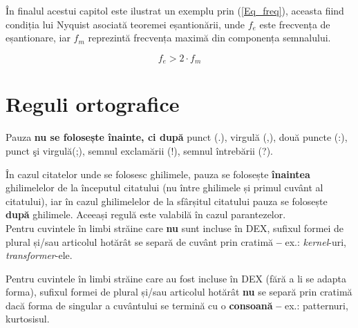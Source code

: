 În finalul acestui capitol este ilustrat un exemplu prin (\ref{Eq_freq}), aceasta fiind condiția lui Nyquist asociată teoremei eșantionării, unde $f_e$ este frecvența de eșantionare, iar $f_m$ reprezintă frecvența maximă din componența semnalului.

\begin{equation}
    f_e > 2 \cdot f_m
    \label{Eq_freq}
\end{equation}

\section{Reguli ortografice}

Pauza \textbf{nu se folosește înainte, ci după} punct (.), virgulă (,), două puncte (:), punct şi virgulă(;), semnul exclamării (!), semnul întrebării (?).
 
În cazul citatelor unde se folosesc ghilimele, pauza se folosește \textbf{înaintea} ghilimelelor de la începutul citatului (nu între ghilimele și primul cuvânt al citatului), iar în cazul ghilimelelor de la sfârșitul citatului pauza se folosește \textbf{după} ghilimele. Aceeași regulă este valabilă în cazul parantezelor.\\

Pentru cuvintele în limbi străine care \textbf{nu} sunt incluse în DEX, sufixul formei de plural și/sau articolul hotărât se separă de cuvânt prin cratimă \textbf{--} ex.: \textit{kernel}-uri, \textit{transformer}-ele.

Pentru cuvintele în limbi străine care au fost incluse în DEX (fără a li se adapta forma), sufixul formei de plural și/sau articolul hotărât \textbf{nu} se separă prin cratimă dacă forma de singular a cuvântului se termină cu o \textbf{consoană} \textbf{--} ex.: patternuri, kurtosisul.




